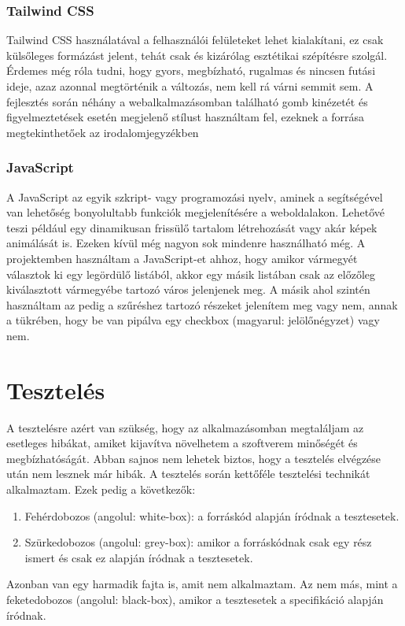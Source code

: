 \documentclass[]{thesis-ekf}
\theoremstyle{definition}
\theoremstyle{remark}
\begin{document}
	\subsection{Tailwind CSS}\label{sc-tailwind}
		Tailwind CSS használatával a felhasználói felületeket lehet kialakítani, ez csak külsőleges formázást jelent, tehát csak és kizárólag esztétikai szépítésre szolgál. Érdemes még róla tudni, hogy gyors, megbízható, rugalmas és nincsen futási ideje, azaz azonnal megtörténik a változás, nem kell rá várni semmit sem. A fejlesztés során néhány a webalkalmazásomban található gomb kinézetét és figyelmeztetések esetén megjelenő stílust használtam fel, ezeknek a forrása megtekinthetőek az irodalomjegyzékben \cite{tailwind, FlowBite}
	\subsection{JavaScript}\label{javascript}
		A JavaScript az egyik szkript- vagy programozási nyelv, aminek a segítségével van lehetőség bonyolultabb funkciók megjelenítésére a weboldalakon. Lehetővé teszi például egy dinamikusan frissülő tartalom létrehozását vagy akár képek animálását is. Ezeken kívül még nagyon sok mindenre használható még. A projektemben használtam a JavaScript-et ahhoz, hogy amikor vármegyét választok ki egy legördülő listából, akkor egy másik listában csak az előzőleg kiválasztott vármegyébe tartozó város jelenjenek meg. A másik ahol szintén használtam az pedig a szűréshez tartozó részeket jelenítem meg vagy nem, annak a tükrében, hogy be van pipálva egy checkbox (magyarul: jelölőnégyzet) vagy nem.
		
	\chapter{Tesztelés}
		A tesztelésre azért van szükség, hogy az alkalmazásomban megtaláljam az esetleges hibákat, amiket kijavítva növelhetem a szoftverem minőségét és megbízhatóságát. Abban sajnos nem lehetek biztos, hogy a tesztelés elvégzése után nem lesznek már hibák. A tesztelés során kettőféle tesztelési technikát alkalmaztam. Ezek pedig a következők:
		\begin{enumerate}
			\item Fehérdobozos (angolul: white-box): a forráskód alapján íródnak a tesztesetek.
			\item Szürkedobozos (angolul: grey-box): amikor a forráskódnak csak egy rész ismert és csak ez alapján íródnak a tesztesetek.
		\end{enumerate}
		Azonban van egy harmadik fajta is, amit nem alkalmaztam. Az nem más, mint a feketedobozos (angolul: black-box), amikor a tesztesetek a specifikáció alapján íródnak.
		\cite{Kusper}
\end{document}
